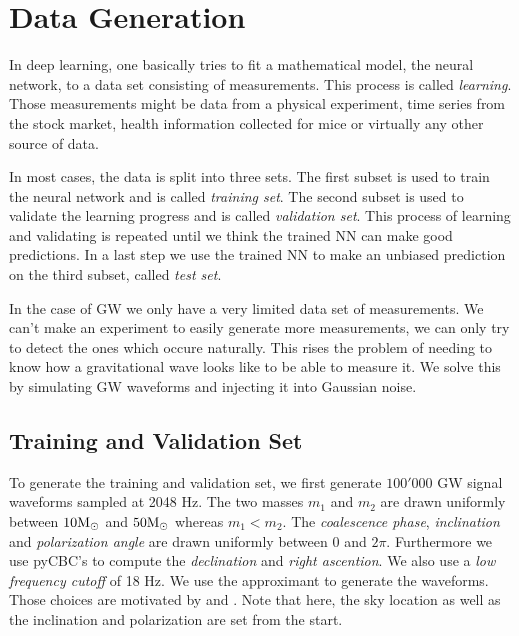 
\section{Data Generation}
In deep learning, one basically tries to fit a mathematical model, the neural
network, to a data set consisting of measurements. This process is called
\textit{learning}.
Those measurements might be data from a physical experiment, time series from
the stock market, health information collected for mice or virtually any
other source of data.

In most cases, the data is split into three sets. The first subset is used to
train the neural network and is called \textit{training set}. The second subset 
is used to validate the learning progress and is called \textit{validation set}.
This process of learning and validating is repeated until we think the trained
NN can make good predictions. In a last step we use the trained NN to make an
unbiased prediction on the third subset, called \textit{test set}.

In the case of GW we only have a very limited data set of measurements. We can't
make an experiment to easily generate more measurements, we can only try to 
detect the ones which occure naturally. This rises the problem of needing to 
know how a gravitational wave looks like to be able to measure it. We solve this
by simulating GW waveforms and injecting it into Gaussian noise.

\subsection{Training and Validation Set}
To generate the training and validation set, we first generate $100'000$ GW signal
waveforms sampled at 2048 Hz. The two masses $m_1$ and $m_2$ are drawn uniformly
between $10 \textup{M}_\odot$
and $50 \textup{M}_\odot$ whereas $m_1 < m_2$. The \textit{coalescence phase},
\textit{inclination} and \textit{polarization angle} are drawn uniformly between
$0$ and $2 \pi$. Furthermore we use
pyCBC's  to compute the \textit{declination} and
\textit{right ascention}. We also use a \textit{low frequency cutoff} of 18 Hz.
We use the  approximant to generate the waveforms. Those
choices are motivated by \cite{PhysRevD.105.043002} and \cite{MLGWSC1}. 
Note that here, the sky 
location as well as the inclination and polarization are set from the start.

